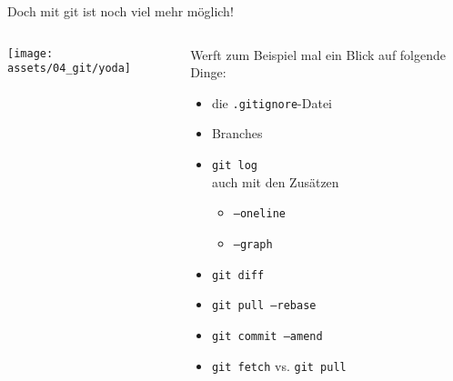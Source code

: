 \begin{frame}
	\centering \Large \alert{Doch mit git ist noch viel mehr möglich!}
	\normalsize
	\vfill
	\begin{columns}[onlytextwidth]
		\hspace*{-.05\textwidth}
		\begin{column}{0.6\textwidth}
			\centering \texttt{[image: assets/04\_git/yoda]}
		\end{column}
		\begin{column}{0.5\textwidth}
			Werft zum Beispiel mal ein Blick auf folgende Dinge:
			\begin{itemize}
				\item die \texttt{.gitignore}-Datei
				\item Branches
				\item \texttt{git log} \\auch mit den Zusätzen
				\begin{itemize}
					\item[] \texttt{--oneline}
					\item[] \texttt{--graph}
				\end{itemize}
				\item \texttt{git diff}
				\item \texttt{git pull --rebase}
				\item \texttt{git commit --amend}
				\item \texttt{git fetch} vs. \texttt{git pull}
			\end{itemize}
		\end{column}
	\end{columns}
\end{frame}

